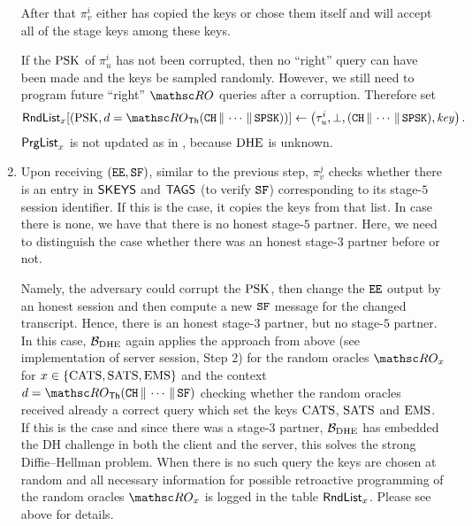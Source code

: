 \begin{enumerate}
		After that $\pi_v^i$ either has copied the keys or chose them itself and will accept all of the stage keys among these keys.
		
		If the $\mathrm{PSK}$ of $\pi_u^i$ has not been corrupted, then no ``right'' query can have been made and the keys be sampled randomly. 
		However, we still need to program future ``right'' $\RO$ queries after a corruption.
		Therefore set
		\[
		\rndTable_x[(\psk, d = \RO_\Thash(\CH \concat \dotsb \concat \SPSKtls) )] \assign \left(  \tau_u^i, \bot, (\CH \concat \dotsb \concat \SPSKtls), \mathit{key} \right).
		\]
		$\mathsf{PrgList}_{x}$ is not updated as in \thisGame, because $\mathrm{DHE}$ is unknown.
		\item 	Upon receiving $(\mathtt{EE}, \mathtt{SF})$, similar to the previous step, $\pi_v^j$ checks whether there is an entry in $\mathsf{SKEYS}$ and $\mathsf{TAGS}$ (to verify $\mathtt{SF}$) corresponding to its stage-$5$ session identifier.
		If this is the case, it copies the keys from that list.
		In case there is none, we have that there is no honest stage-$5$ partner.
		Here, we need to distinguish the case whether there was an honest stage-$3$ partner before or not.
		
		Namely, the adversary could corrupt the $\mathrm{PSK}$, then change the $\mathtt{EE}$ output by an honest session and then compute a new $\mathtt{SF}$ message for the changed transcript.
		Hence, there is an honest stage-$3$ partner, but no stage-$5$ partner.
		In this case, $\mathcal{B}_{\mathrm{DHE}}$ again applies the approach from above (see implementation of server session, Step 2) for the random oracles $\RO_{x}$ for $x \in \{\mathrm{CATS}, \mathrm{SATS}, \mathrm{EMS}\}$ and the context $d = \RO_\Thash(\CH \concat \dotsb \concat \SF)$ checking whether the random oracles received already a correct query which set the keys $\mathrm{CATS}$, $\mathrm{SATS}$ and $\mathrm{EMS}$.
		If this is the case and since there was a stage-$3$ partner, $\mathcal{B}_{\mathrm{DHE}}$ has embedded the DH challenge in both the client and the server, this solves the strong Diffie--Hellman problem.
		When there is no such query the keys are chosen at random and all necessary information for possible retroactive programming of the random oracles $\RO_{x}$ is logged in the table $\mathsf{RndList}_{x}$.
		Please see above for details.
		

\end{enumerate}
